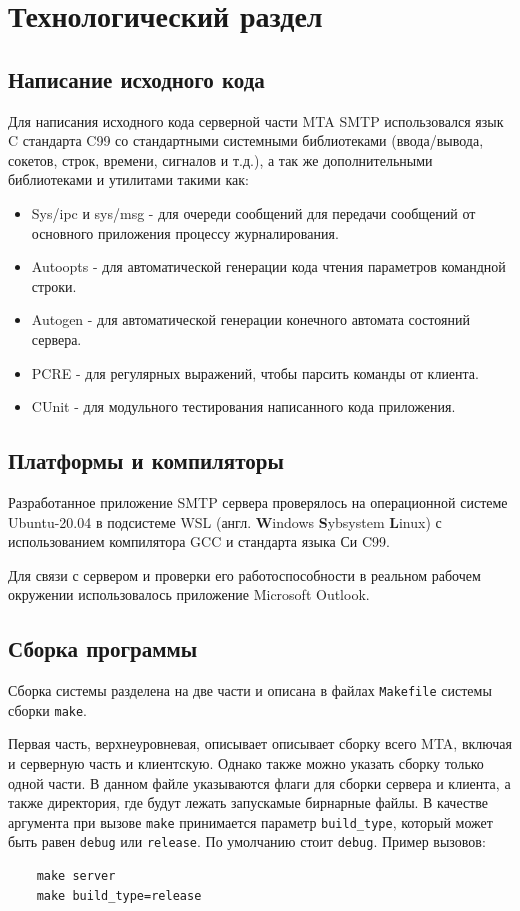 \documentclass[a4paper,12pt]{report}
\begin{document}
\chapter{Технологический раздел}


\section{Написание исходного кода}

Для написания исходного кода серверной части MTA SMTP использовался язык C стандарта C99 со стандартными системными библиотеками (ввода/вывода, сокетов, строк, времени, сигналов и т.д.), а так же дополнительными библиотеками и утилитами такими как:
\begin{itemize}
    \item Sys/ipc и sys/msg - для очереди сообщений для передачи сообщений от основного приложения процессу журналирования.
    \item Autoopts - для автоматической генерации кода чтения параметров командной строки.
    \item Autogen - для автоматической генерации конечного автомата состояний сервера.
    \item PCRE - для регулярных выражений, чтобы парсить команды от клиента.
    \item CUnit - для модульного тестирования написанного кода приложения.
\end{itemize}


\section{Платформы и компиляторы}

Разработанное приложение SMTP сервера проверялось на операционной системе Ubuntu-20.04 в подсистеме WSL (англ. \textbf{W}indows \textbf{S}ybsystem \textbf{L}inux) с использованием компилятора GCC и стандарта языка Си C99.

Для связи с сервером и проверки его работоспособности в реальном рабочем окружении использовалось приложение Microsoft Outlook.


\section{Сборка программы}

Сборка системы разделена на две части и описана в файлах \texttt{Makefile} системы сборки \texttt{make}.

Первая часть, верхнеуровневая, описывает описывает сборку всего MTA, включая и серверную часть и клиентскую. Однако также можно указать сборку только одной части. В данном файле указываются флаги для сборки сервера и клиента, а также директория, где будут лежать запускамые бирнарные файлы. В качестве аргумента при вызове \texttt{make} принимается параметр \texttt{build\_type}, который может быть равен \texttt{debug} или \texttt{release}. По умолчанию стоит \texttt{debug}. Пример вызовов:
\begin{verbatim}
    make server
    make build_type=release
\end{verbatim}
\end{document}
